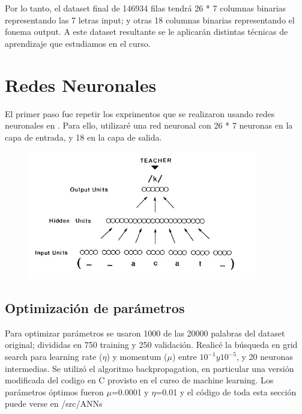 \documentclass[paper=a4, fontsize=11pt]{scrartcl} %
\numberwithin{equation}{section} %
\numberwithin{figure}{section} %
\numberwithin{table}{section} %
\begin{document}
Por lo tanto, el dataset final de 146934 filas tendrá 26 * 7 columnas binarias representando las 7 letras input; y otras 18 columnas binarias representando el fonema output. A este dataset resultante se le aplicarán distintas técnicas de aprendizaje que estudiamos en el curso.

\section{Redes Neuronales}
El primer paso fue repetir los exprimentos que se realizaron usando redes neuronales en \cite{parallel}. Para ello, utilizaré una red neuronal con 26 * 7 neuronas en la capa de entrada, y 18 en la capa de salida. 

\begin{figure}[h!]
\centering
\includegraphics[width=100mm]{imgs/figure1.jpg}
\end{figure}

\subsection{Optimización de parámetros}

Para optimizar parámetros se usaron 1000 de las 20000 palabras del dataset original; divididas en 750 training y 250 validación. Realicé la búsqueda en grid search para learning rate ($\eta$) y momentum ($\mu$) entre  $10^{-1} y 10^{-5}$, y 20 neuronas intermedias. Se utilizó el algoritmo backpropagation, en particular una versión modificada del codigo en C provisto en el curso de machine learning. Los parámetros óptimos fueron $\mu$=0.0001 y $\eta$=0.01 y el código de toda esta sección puede verse en /src/ANNs

\end{document}
